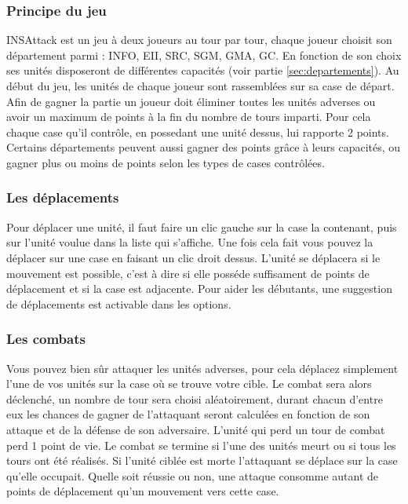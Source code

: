 \subsubsection{Principe du jeu}
INSAttack est un jeu à deux joueurs au tour par tour, chaque joueur choisit son département parmi : INFO, EII, SRC, SGM, GMA, GC. En fonction de son choix ses unités disposeront de différentes capacités (voir partie \ref{sec:departements}). Au début du jeu, les unités de chaque joueur sont rassemblées sur sa case de départ. Afin de gagner la partie un joueur doit éliminer toutes les unités adverses ou avoir un maximum de points à la fin du nombre de tours imparti. Pour cela chaque case qu'il contrôle, en possedant une unité dessus, lui rapporte 2 points. Certains départements peuvent aussi gagner des points grâce à leurs capacités, ou gagner plus ou moins de points selon les types de cases contrôlées.

\subsubsection{Les déplacements}
Pour déplacer une unité, il faut faire un clic gauche sur la case la contenant, puis sur l'unité voulue dans la liste qui s'affiche. Une fois cela fait vous pouvez la déplacer sur une case en faisant un clic droit dessus. L'unité se déplacera si le mouvement est possible, c'est à dire si elle posséde suffisament de points de déplacement et si la case est adjacente.
Pour aider les débutants, une suggestion de déplacements est activable dans les options.

\subsubsection{Les combats}
Vous pouvez bien sûr attaquer les unités adverses, pour cela déplacez simplement l'une de vos unités sur la case où se trouve votre cible. Le combat sera alors déclenché, un nombre de tour sera choisi aléatoirement, durant chacun d'entre eux les chances de gagner de l'attaquant seront calculées en fonction de son attaque et de la défense de son adversaire. L'unité qui perd un tour de combat perd 1 point de vie. Le combat se termine si l'une des unités meurt ou si tous les tours ont été réalisés. Si l'unité ciblée est morte l'attaquant se déplace sur la case qu'elle occupait. Quelle soit réussie ou non, une attaque consomme autant de points de déplacement qu'un mouvement vers cette case.